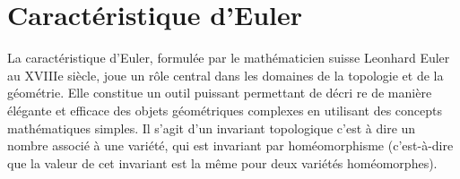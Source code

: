 \label{chap:annexes}

\chapter{Caractéristique d'Euler}

La caractéristique d'Euler, formulée par le mathématicien suisse Leonhard Euler au XVIIIe siècle, joue un rôle central dans les domaines de la topologie et de la géométrie. Elle constitue un outil puissant permettant de décri re de manière élégante et efficace des objets géométriques complexes en utilisant des concepts mathématiques simples. Il s'agit d'un invariant topologique c'est à dire un nombre associé à une variété, qui est invariant par homéomorphisme (c’est-à-dire que la valeur de cet invariant est la même pour deux variétés homéomorphes).
